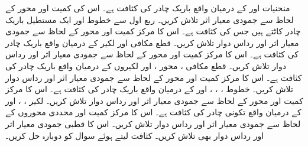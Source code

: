 منحنیات   اور  کے درمیان واقع  باریک چادر کی کثافت  ہے۔ اس کی کمیت اور محور  کے لحاظ سے جمودی معیار اثر تلاش کریں۔
ربع اول سے خطوط  اور  ایک مستطیل  باریک چادر کاٹتے ہیں جس کی کثافت  ہے۔ اس کا مرکز کمیت اور محور  کے لحاظ سے جمودی معیار اثر  اور رداس دوار تلاش کریں۔
قطع مکافی  اور لکیر  کے درمیان واقع باریک چادر کی کثافت  ہے۔ اس کا مرکز کمیت اور محور  کے لحاظ سے جمودی معیار اثر اور رداس  دوار تلاش کریں۔
قطع مکافی ، محور ،  اور  لکیروں  کے درمیان واقع باریک چادر کی کثافت  ہے۔ اس کا مرکز کمیت اور محور  کے لحاظ سے جمودی معیار اثر اور رداس  دوار تلاش کریں۔
خطوط  ،   ، ،  اور   کے درمیان واقع باریک چادر کی کثافت  ہے۔ اس کا مرکز کمیت اور محور  کے لحاظ سے جمودی معیار اثر اور رداس  دوار تلاش کریں۔
لکیر ، ،  اور  کے درمیان واقع  تکونی چادر کی کثافت  ہے۔ اس کا مرکز کمیت  اور محددی محوروں کے لحاظ سے جمودی معیار اثر اور رداس دوار تلاش کریں۔ اس کا قطبی جمودی معیار اثر اور  رداس دوار بھی تلاش کریں۔
کثافت  لیتے ہوئے سوال  کو دوبارہ حل کریں۔

